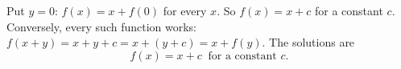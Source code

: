 Put $y=0$: $f(x)=x+f(0)$ for every $x$. So $f(x)=x+c$ for a constant $c$. Conversely, every such function works: $f(x+y)=x+y+c=x+(y+c)=x+f(y)$. The solutions are
\[
\boxed{f(x)=x+c\ \text{ for a constant } c}.
\]
